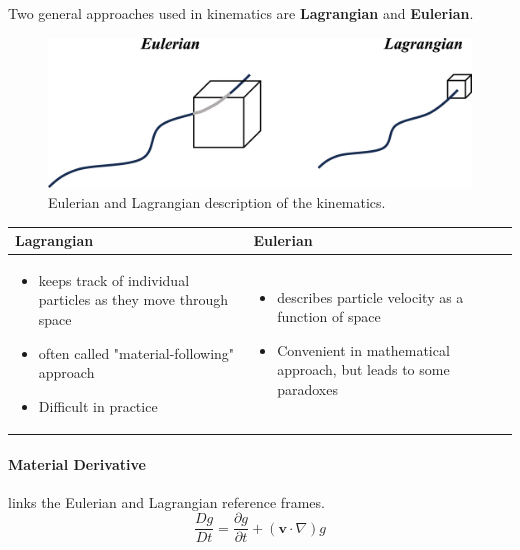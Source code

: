 \documentclass[12pt, a4paper]{article}
\begin{document}
Two general approaches used in kinematics are \textbf{Lagrangian} and \textbf{Eulerian}.

\begin{figure}[H]
    \centering
    \includegraphics[width=.7\textwidth]{img/lagrangian_eulerian.eps}
    \caption{Eulerian and Lagrangian description of the kinematics.}
\end{figure}

\begin{table}[H]
    \centering
    \begin{tabularx}{\textwidth}{X|X}
         \textbf{Lagrangian} & \textbf{Eulerian} \\ \hline
        \begin{itemize}
           \item keeps track of individual particles as they move through space 
           \item often called "material-following" approach
           \item Difficult in practice
        \end{itemize}
        & 
        \begin{itemize}
            \item describes particle velocity as a function of space
            \item Convenient in mathematical approach, but leads to some paradoxes
        \end{itemize} 
    \end{tabularx}
\end{table}

\paragraph{Material Derivative} links the Eulerian and Lagrangian reference frames.
\[ 
    \frac{Dg}{Dt} = \frac{\partial g}{\partial t}+ (\bm{v} \cdot \nabla)g 
\]
 
\end{document}

